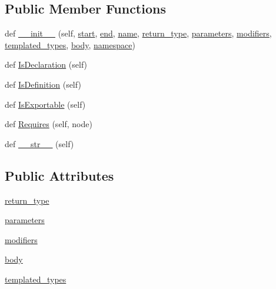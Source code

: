 \subsection*{Public Member Functions}
\begin{DoxyCompactItemize}
\item 
def \hyperlink{classcpp_1_1ast_1_1_function_ab5270f5d353ec5e9dcd136e4cc6c7f6c}{\+\_\+\+\_\+init\+\_\+\+\_\+} (self, \hyperlink{classcpp_1_1ast_1_1_node_a7b2aa97e6a049bb1a93aea48c48f1f44}{start}, \hyperlink{classcpp_1_1ast_1_1_node_a3c5e5246ccf619df28eca02e29d69647}{end}, \hyperlink{classcpp_1_1ast_1_1___generic_declaration_af774f4729dfd78d0538a6782fe8514c1}{name}, \hyperlink{classcpp_1_1ast_1_1_function_af750fd788d7ab33163ee066534780212}{return\+\_\+type}, \hyperlink{classcpp_1_1ast_1_1_function_a0e61ef47af9cf2fd4402dbd8cab631ef}{parameters}, \hyperlink{classcpp_1_1ast_1_1_function_ad30eed435f1ff9ff34ade9cc0d7be121}{modifiers}, \hyperlink{classcpp_1_1ast_1_1_function_a57bb03218bade3240137a0d91c467cb6}{templated\+\_\+types}, \hyperlink{classcpp_1_1ast_1_1_function_a8e25e5016b23b38e32acf2df529c0650}{body}, \hyperlink{classcpp_1_1ast_1_1___generic_declaration_a8aee3f11b37449d54b42a78e0a689f46}{namespace})
\item 
def \hyperlink{classcpp_1_1ast_1_1_function_ab9120d9a774eb5860d220b3bcdcaa87e}{Is\+Declaration} (self)
\item 
def \hyperlink{classcpp_1_1ast_1_1_function_ad5d96144bd8418ac72332bffb21ea86f}{Is\+Definition} (self)
\item 
def \hyperlink{classcpp_1_1ast_1_1_function_a85a073cd69116bc6191f379d69d10d72}{Is\+Exportable} (self)
\item 
def \hyperlink{classcpp_1_1ast_1_1_function_a999e7b5e43517cd4d68b1aeea8a7d6e1}{Requires} (self, node)
\item 
def \hyperlink{classcpp_1_1ast_1_1_function_aaef91d6a3b1eb2703eebb32d39c45978}{\+\_\+\+\_\+str\+\_\+\+\_\+} (self)
\end{DoxyCompactItemize}
\subsection*{Public Attributes}
\begin{DoxyCompactItemize}
\item 
\hyperlink{classcpp_1_1ast_1_1_function_af750fd788d7ab33163ee066534780212}{return\+\_\+type}
\item 
\hyperlink{classcpp_1_1ast_1_1_function_a0e61ef47af9cf2fd4402dbd8cab631ef}{parameters}
\item 
\hyperlink{classcpp_1_1ast_1_1_function_ad30eed435f1ff9ff34ade9cc0d7be121}{modifiers}
\item 
\hyperlink{classcpp_1_1ast_1_1_function_a8e25e5016b23b38e32acf2df529c0650}{body}
\item 
\hyperlink{classcpp_1_1ast_1_1_function_a57bb03218bade3240137a0d91c467cb6}{templated\+\_\+types}
\end{DoxyCompactItemize}


